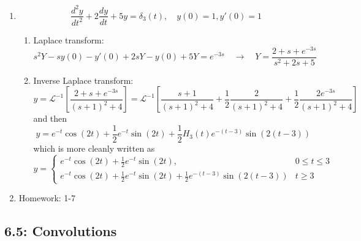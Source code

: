 \documentclass{article}
\begin{document}
\begin{enumerate}
\item
\[
\frac{d^2y}{dt^2}+2\frac{dy}{dt}+5y = \delta_3(t), \quad y(0)=1, y'(0)=1
\]
\begin{enumerate}
\item Laplace transform:
\[
s^2 Y -sy(0)-y'(0) + 2sY - y(0) + 5Y = e^{-3s} \quad \rightarrow \quad
Y = \frac{2+s+e^{-3s}}{s^2+2s+5} 
\] 
\item Inverse Laplace transform:
\[
y = \mathcal{L}^{-1} \left[ \frac{2+s+e^{-3s}}{(s+1)^2+4} \right]
= \mathcal{L}^{-1} \left[ \frac{s+1}{(s+1)^2+4}+\frac{1}{2}\frac{2}{(s+1)^2+4} + \frac{1}{2}\frac{2e^{-3s}}{(s+1)^2+4}\right]
\]
and then
\[
y = e^{-t}\cos(2t)+\frac{1}{2}e^{-t}\sin(2t)+\frac{1}{2}H_3(t)e^{-(t-3)}\sin(2(t-3))
\]
which is more cleanly written as
\[
y =
\begin{cases}
e^{-t}\cos(2t)+\frac{1}{2}e^{-t}\sin(2t), & 0 \leq t \leq 3 \\
e^{-t}\cos(2t)+\frac{1}{2}e^{-t}\sin(2t)+\frac{1}{2}e^{-(t-3)}\sin(2(t-3)) & t\geq 3
\end{cases}
\]
\end{enumerate}

\item Homework: 1-7

\end{enumerate}

\subsection{6.5: Convolutions}
\end{document}

